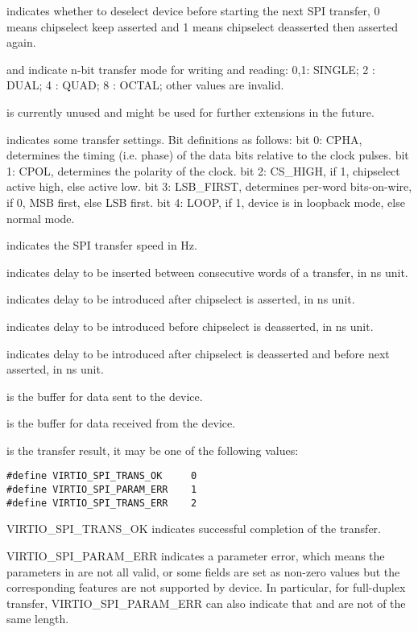  indicates whether to deselect device before starting the next SPI transfer,
0 means chipselect keep asserted and 1 means chipselect deasserted then asserted again.

 and  indicate n-bit transfer mode for writing and reading:
        0,1: SINGLE;
        2  : DUAL;
        4  : QUAD;
        8  : OCTAL;
        other values are invalid.

 is currently unused and might be used for further extensions in the future.

 indicates some transfer settings. Bit definitions as follows:
        bit 0: CPHA, determines the timing (i.e. phase) of the data bits relative to the
	       clock pulses.
        bit 1: CPOL, determines the polarity of the clock.
        bit 2: CS_HIGH, if 1, chipselect active high, else active low.
        bit 3: LSB_FIRST, determines per-word bits-on-wire, if 0, MSB first, else LSB first.
        bit 4: LOOP, if 1, device is in loopback mode, else normal mode.

 indicates the SPI transfer speed in Hz.

 indicates delay to be inserted between consecutive words of a transfer,
in ns unit.

 indicates delay to be introduced after chipselect is asserted, in ns unit.

 indicates delay to be introduced before chipselect is deasserted,
in ns unit.

 indicates delay to be introduced after chipselect is
deasserted and before next asserted, in ns unit.

 is the buffer for data sent to the device.

 is the buffer for data received from the device.

 is the transfer result, it may be one of the following values:

\begin{lstlisting}
#define VIRTIO_SPI_TRANS_OK     0
#define VIRTIO_SPI_PARAM_ERR    1
#define VIRTIO_SPI_TRANS_ERR    2
\end{lstlisting}

VIRTIO_SPI_TRANS_OK indicates successful completion of the transfer.

VIRTIO_SPI_PARAM_ERR indicates a parameter error, which means the parameters in
 are not all valid, or some fields are set as
non-zero values but the corresponding features are not supported by device.
In particular, for full-duplex transfer, VIRTIO_SPI_PARAM_ERR can also indicate that
 and  are not of the same length.

